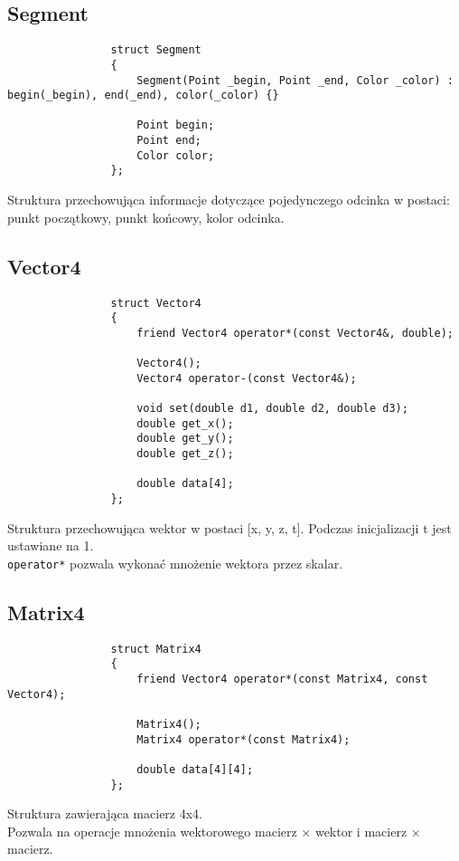 		\subsection{Segment}
			\begin{lstlisting}
				struct Segment
				{
				    Segment(Point _begin, Point _end, Color _color) : begin(_begin), end(_end), color(_color) {}
				
				    Point begin;
				    Point end;
				    Color color;
				};
			\end{lstlisting}
			Struktura przechowująca informacje dotyczące pojedynczego odcinka w postaci: punkt początkowy, punkt końcowy, kolor odcinka.
		\subsection{Vector4}
			\begin{lstlisting}
				struct Vector4
				{
				    friend Vector4 operator*(const Vector4&, double);
				
				    Vector4();
				    Vector4 operator-(const Vector4&);
				
				    void set(double d1, double d2, double d3);
				    double get_x();
				    double get_y();
				    double get_z();
				
				    double data[4];
				};
			\end{lstlisting}
			Struktura przechowująca wektor w postaci [x, y, z, t]. Podczas inicjalizacji t jest ustawiane na 1.\\
			\lstinline|operator*| pozwala wykonać mnożenie wektora przez skalar.
		\subsection{Matrix4}
			\begin{lstlisting}
				struct Matrix4
				{
				    friend Vector4 operator*(const Matrix4, const Vector4);
				
				    Matrix4();
				    Matrix4 operator*(const Matrix4);
				
				    double data[4][4];
				};
			\end{lstlisting}
			Struktura zawierająca macierz 4x4.\\
			Pozwala na operacje mnożenia wektorowego macierz $\times$ wektor i macierz $\times$ macierz.

